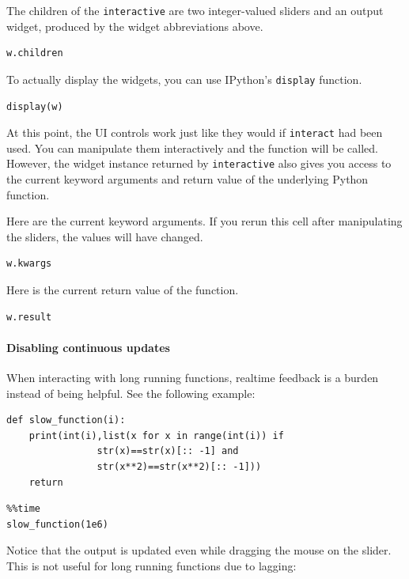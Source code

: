 The children of the \texttt{interactive} are two integer-valued sliders and an output widget, produced by the widget abbreviations above.

\begin{verbatim}
w.children
\end{verbatim}

To actually display the widgets, you can use IPython's \texttt{display} function.

\begin{verbatim}
display(w)
\end{verbatim}

At this point, the UI controls work just like they would if \texttt{interact} had been used. You can manipulate them interactively and the function will be called. However, the widget instance returned by \texttt{interactive} also gives you access to the current keyword arguments and return value of the underlying Python function.

Here are the current keyword arguments. If you rerun this cell after manipulating the sliders, the values will have changed.

\begin{verbatim}
w.kwargs
\end{verbatim}

Here is the current return value of the function.

\begin{verbatim}
w.result
\end{verbatim}

\paragraph{Disabling continuous updates}

When interacting with long running functions, realtime feedback is a burden instead of being helpful.  See the following example:

\begin{verbatim}
def slow_function(i):
    print(int(i),list(x for x in range(int(i)) if 
                str(x)==str(x)[:: -1] and 
                str(x**2)==str(x**2)[:: -1]))
    return
\end{verbatim}

\begin{verbatim}
%%time
slow_function(1e6)
\end{verbatim}

Notice that the output is updated even while dragging the mouse on the slider. This is not useful for long running functions due to lagging:

